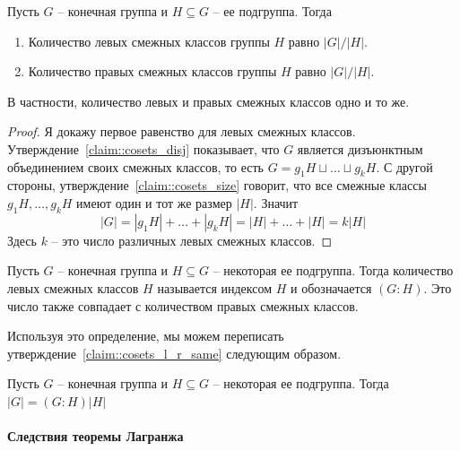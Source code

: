 \begin{claim}
\label{claim::cosets_l_r_same}
Пусть $G$ -- конечная группа и $H\subseteq G$ -- ее подгруппа.
Тогда
\begin{enumerate}
\item Количество левых смежных классов группы $H$ равно $|G|/|H|$.

\item Количество правых смежных классов группы $H$ равно $|G|/|H|$.
\end{enumerate}
В частности, количество левых и правых смежных классов одно и то же.
\end{claim}
\begin{proof}
Я докажу первое равенство для левых смежных классов.
Утверждение~\ref{claim::cosets_disj} показывает, что  $G$ является дизъюнктным объединением своих смежных классов, то есть $G = g_1 H \sqcup \ldots \sqcup g_k H$.
С другой стороны, утверждение~\ref{claim::cosets_size} говорит, что все смежные классы $g_1H,\ldots, g_kH$ имеют один и тот же размер $|H|$.
Значит
\[
|G| = |g_1H| + \ldots +|g_k H| = |H| + \ldots + |H| = k |H|
\]
Здесь $k$ -- это число различных левых смежных классов.
\end{proof}

\begin{definition}
Пусть $G$ -- конечная группа и $H\subseteq G$ -- некоторая ее подгруппа.
Тогда количество левых смежных классов $H$ называется индексом $H$ и обозначается $(G:H)$.
Это число также совпадает с количеством правых смежных классов.
\end{definition}

Используя это определение, мы можем переписать утверждение~\ref{claim::cosets_l_r_same} следующим образом.

\begin{claim}
Пусть $G$ -- конечная группа и $H\subseteq G$ -- некоторая ее подгруппа.
Тогда $|G| = (G : H)|H|$
\end{claim}


\paragraph{Следствия теоремы Лагранжа}

